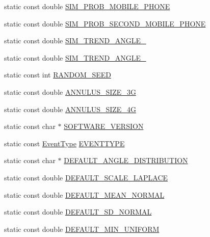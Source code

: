 \begin{DoxyCompactItemize}
static const double \hyperlink{class_constants_a8af75c6e731c2f425cce792b33786db7}{S\+I\+M\+\_\+\+P\+R\+O\+B\+\_\+\+M\+O\+B\+I\+L\+E\+\_\+\+P\+H\+O\+NE}
\item 
static const double \hyperlink{class_constants_aafd39df52173dca1074d8c92aa5f9649}{S\+I\+M\+\_\+\+P\+R\+O\+B\+\_\+\+S\+E\+C\+O\+N\+D\+\_\+\+M\+O\+B\+I\+L\+E\+\_\+\+P\+H\+O\+NE}
\item 
static const double \hyperlink{class_constants_a97968377c9a3cf2995c37aa63d3dd505}{S\+I\+M\+\_\+\+T\+R\+E\+N\+D\+\_\+\+A\+N\+G\+L\+E\+\_}
\item 
static const double \hyperlink{class_constants_a1ec9cdffb9c58a2ff1cb60f64b056835}{S\+I\+M\+\_\+\+T\+R\+E\+N\+D\+\_\+\+A\+N\+G\+L\+E\+\_}
\item 
static const int \hyperlink{class_constants_ac80eccfaa8e498ad3fc6ea0a2c3d38a0}{R\+A\+N\+D\+O\+M\+\_\+\+S\+E\+ED}
\item 
static const double \hyperlink{class_constants_a66de7fc72fc30ccf2599816cf607c14c}{A\+N\+N\+U\+L\+U\+S\+\_\+\+S\+I\+Z\+E\+\_\+3G}
\item 
static const double \hyperlink{class_constants_a8ff3d2e927af8b78332fcf1d72891fc7}{A\+N\+N\+U\+L\+U\+S\+\_\+\+S\+I\+Z\+E\+\_\+4G}
\item 
static const char $\ast$ \hyperlink{class_constants_a6049bf9f7258073e70696221b0fc5b3a}{S\+O\+F\+T\+W\+A\+R\+E\+\_\+\+V\+E\+R\+S\+I\+ON}
\item 
static const \hyperlink{_event_type_8h_a2628ea8d12e8b2563c32f05dc7fff6fa}{Event\+Type} \hyperlink{class_constants_a10eced3c79b838621f744eb1ca0b1195}{E\+V\+E\+N\+T\+T\+Y\+PE}
\item 
static const char $\ast$ \hyperlink{class_constants_a5c160562a1c7a4b6fb42be9c8ab51fa2}{D\+E\+F\+A\+U\+L\+T\+\_\+\+A\+N\+G\+L\+E\+\_\+\+D\+I\+S\+T\+R\+I\+B\+U\+T\+I\+ON}
\item 
static const double \hyperlink{class_constants_a8b08b468ea38caf46e4f1f4ef27065ce}{D\+E\+F\+A\+U\+L\+T\+\_\+\+S\+C\+A\+L\+E\+\_\+\+L\+A\+P\+L\+A\+CE}
\item 
static const double \hyperlink{class_constants_ac1dc5a89a1de331d8dabd10bc88f1a79}{D\+E\+F\+A\+U\+L\+T\+\_\+\+M\+E\+A\+N\+\_\+\+N\+O\+R\+M\+AL}
\item 
static const double \hyperlink{class_constants_ac950a1666ca87477d83b2ca5efdbbf66}{D\+E\+F\+A\+U\+L\+T\+\_\+\+S\+D\+\_\+\+N\+O\+R\+M\+AL}
\item 
static const double \hyperlink{class_constants_ac795990b722ff47dd0fdf06638c57dd6}{D\+E\+F\+A\+U\+L\+T\+\_\+\+M\+I\+N\+\_\+\+U\+N\+I\+F\+O\+RM}

\end{DoxyCompactItemize}
